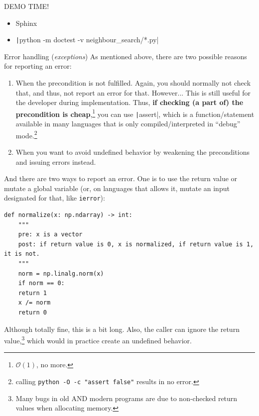 \documentclass[10pt,
aspectratio=169
]{beamer}
\begin{document}
\begin{frame}
	\begin{center}
		{\LARGE DEMO TIME!}
	\end{center}
	
	\begin{itemize}
		\item Sphinx
		\item \texttt|python -m doctest -v neighbour_search/*.py|
	\end{itemize}
\end{frame}
\begin{frame}{Error handling (\textit{exceptions})}
As mentioned above, there are two possible reasons for reporting an error:\begin{enumerate}
	\item When the precondition is not fulfilled. Again, you should normally not check that, and thus, not report an error for that. However... This is still useful for the developer during implementation. Thus, \textbf{if checking (a part of) the precondition is cheap},\footnote{$\mathcal{O}(1)$, no more.} you can use \texttt|assert|, which is a function/statement available in many languages that is only compiled/interpreted in ``debug'' mode.\footnote{calling \texttt{python -O -c "assert false"} results in no error.}
	\item When you want to avoid undefined behavior by weakening the preconditions and issuing errors instead.
\end{enumerate}
\end{frame}

\begin{frame}[fragile]
And there are two ways to report an error. One is to use the return value or mutate a global variable (or, on languages that allows it, mutate an input designated for that, like \texttt{ierror}):\begin{verbatim}
def normalize(x: np.ndarray) -> int:
	"""
	pre: x is a vector
	post: if return value is 0, x is normalized, if return value is 1, it is not.
	"""
	norm = np.linalg.norm(x)
	if norm == 0:
	return 1
	x /= norm
	return 0
\end{verbatim}
Although totally fine, this is a bit long. Also, the caller can ignore the return value,\footnote{Many bugs in old AND modern programs are due to non-checked return values when allocating memory.} which would in practice create an undefined behavior.
\vspace{1em}
\end{frame}
\end{document}
